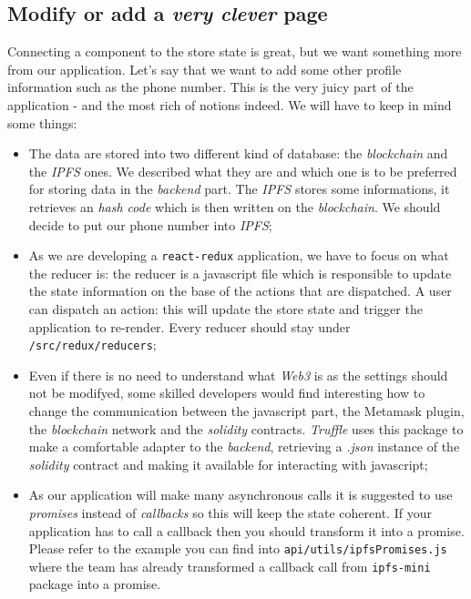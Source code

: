 \subsection{Modify or add a \emph{very clever} page}
\label{IPFS}
Connecting a component to the store state is great, but we want something more from our application. Let's say that we want to add some other profile information such as the phone number. This is the very juicy part of the application - and the most rich of notions indeed. We will have to keep in mind some things:
\begin{itemize}
	\item The data are stored into two different kind of database: the \emph{blockchain} and the \emph{IPFS} ones. We described what they are and which one is to be preferred for storing data in the \emph{backend} part. The \emph{IPFS} stores some informations, it retrieves an \emph{hash code} which is then written on the \emph{blockchain}. We should decide to put our phone number into \emph{IPFS};
	\item As we are developing a \verb|react-redux| application, we have to focus on what the reducer is: the reducer is a javascript file which is responsible to update the state information on the base of the actions that are dispatched. A user can dispatch an action: this will update the store state and trigger the application to re-render. Every reducer should stay under \verb|/src/redux/reducers|;
	\item Even if there is no need to understand what \emph{Web3} is as the settings should not be modifyed, some skilled developers would find interesting how to change the communication between the javascript part, the Metamask plugin, the \emph{blockchain} network and the \emph{solidity} contracts. \emph{Truffle} uses this package to make a comfortable adapter to the \emph{backend}, retrieving a \emph{.json} instance of the \emph{solidity} contract and making it available for interacting with javascript;
	\item As our application will make many asynchronous calls it is suggested to use \emph{promises} instead of \emph{callbacks} so this will keep the state coherent. If your application has to call a callback then you should transform it into a promise. Please refer to the example you can find into \verb|api/utils/ipfsPromises.js| where the team has already transformed a callback call from \verb|ipfs-mini| package into a promise.
\end{itemize}


